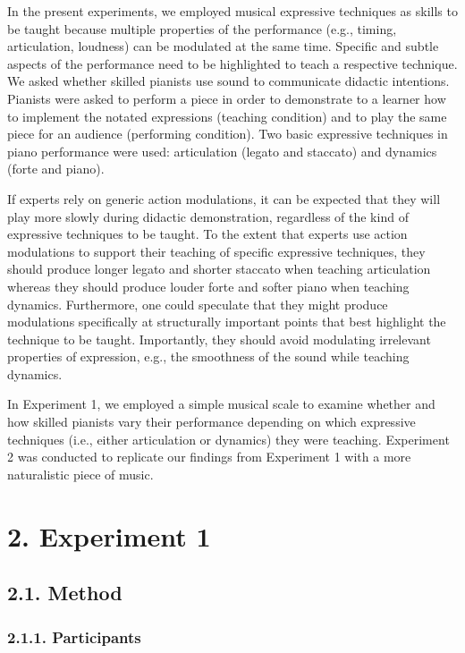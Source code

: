 \documentclass[
  english,
  man,floatsintext]{apa6}
\begin{document}
In the present experiments, we employed musical expressive techniques as skills to be taught because multiple properties of the performance (e.g., timing, articulation, loudness) can be modulated at the same time. Specific and subtle aspects of the performance need to be highlighted to teach a respective technique. We asked whether skilled pianists use sound to communicate didactic intentions. Pianists were asked to perform a piece in order to demonstrate to a learner how to implement the notated expressions (teaching condition) and to play the same piece for an audience (performing condition). Two basic expressive techniques in piano performance were used: articulation (legato and staccato) and dynamics (forte and piano).

If experts rely on generic action modulations, it can be expected that they will play more slowly during didactic demonstration, regardless of the kind of expressive techniques to be taught. To the extent that experts use action modulations to support their teaching of specific expressive techniques, they should produce longer legato and shorter staccato when teaching articulation whereas they should produce louder forte and softer piano when teaching dynamics. Furthermore, one could speculate that they might produce modulations specifically at structurally important points that best highlight the technique to be taught. Importantly, they should avoid modulating irrelevant properties of expression, e.g., the smoothness of the sound while teaching dynamics.

In Experiment 1, we employed a simple musical scale to examine whether and how skilled pianists vary their performance depending on which expressive techniques (i.e., either articulation or dynamics) they were teaching. Experiment 2 was conducted to replicate our findings from Experiment 1 with a more naturalistic piece of music.

\hypertarget{experiment-1}{%
\section{2. Experiment 1}\label{experiment-1}}

\hypertarget{method}{%
\subsection{2.1. Method}\label{method}}

\hypertarget{participants}{%
\subsubsection{2.1.1. Participants}\label{participants}}
\end{document}
